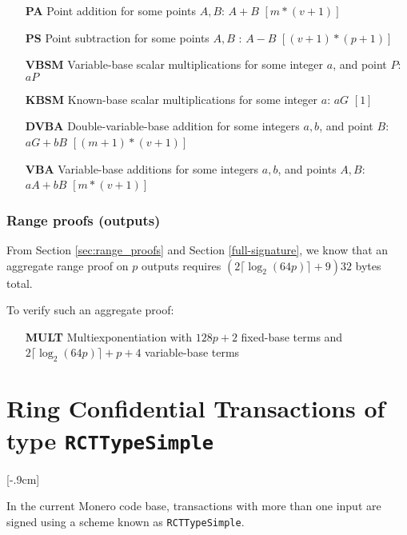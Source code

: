 \begin{itemize}
    \setlength\itemsep{\listspace}
    \item [\textbf{PA}] Point addition for some points $A, B$: $A + B$ \quad \([m*(v+1)]\)%
    \item [\textbf{PS}] Point subtraction for some points $A, B$ : $A - B$ \quad \([(v+1)*(p+1)]\)%
    \item [\textbf{VBSM}] Variable-base scalar multiplications for some integer $a$, and point $P$: $a P$ \quad [$m$]%
    \item [\textbf{KBSM}] Known-base scalar multiplications for some integer $a$: $a G$ \quad \([1]\)
    \item [\textbf{DVBA}] Double-variable-base addition for some integers $a, b$, and point $B$: $a G + b B$ \quad \([(m+1)*(v+1)]\)%
    \item [\textbf{VBA}] Variable-base additions for some integers $a, b$, and points $A, B$: $a A + b B$ \quad \([m*(v+1)]\)%
\end{itemize}


\subsubsection*{Range proofs (outputs)}

From Section \ref{sec:range_proofs} and Section \ref{full-signature}, we know that an aggregate range proof on $p$ outputs requires \( ( 2 \lceil \log_2(64p) \rceil + 9 ) 32 \) bytes total.

To verify such an aggregate proof:

\begin{itemize}
    \setlength\itemsep{\listspace}
    \item [\textbf{MULT}] Multiexponentiation with $128p + 2$ fixed-base terms and $2 \lceil \log_2(64p) \rceil + p + 4$ variable-base terms
\end{itemize}


\section{Ring Confidential Transactions of type {\tt RCTTypeSimple}}[-.9cm]
\label{sec:RCTTypeSimple}

In the current Monero code base, transactions with more than one input are signed using a scheme known as {\tt RCTTypeSimple}.

